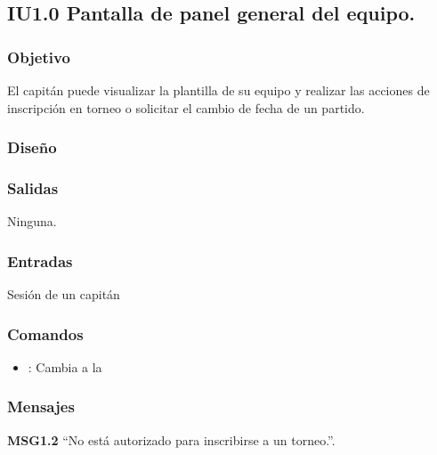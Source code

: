 
\subsection{IU1.0 Pantalla de panel general del equipo.}

\subsubsection{Objetivo}
	El capitán puede visualizar la plantilla de su equipo y realizar las acciones de inscripción en torneo o solicitar el cambio de fecha de un partido.

\subsubsection{Diseño}


\subsubsection{Salidas}

	Ninguna.

\subsubsection{Entradas}
Sesión de un capitán

\subsubsection{Comandos}
\begin{itemize}
	\item {}: Cambia a la 
\end{itemize}

\subsubsection{Mensajes}
	\begin{Citemize}
		\item {\bf MSG1.2 }``No está autorizado para inscribirse a un torneo.''.
	\end{Citemize}

